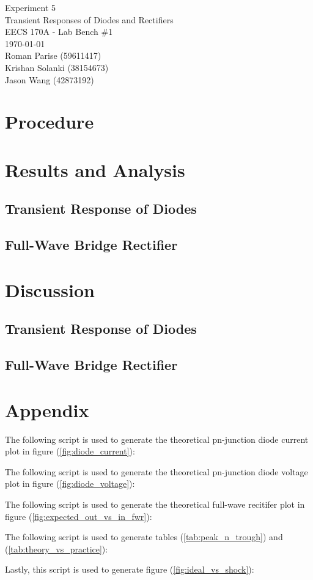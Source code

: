 \documentclass{article}
\begin{document}
	\begin{titlepage}
		\centering
		\Huge{Experiment 5} \\
		\huge{Transient Responses of Diodes and Rectifiers} \\
		\vspace{1cm}
		\large{EECS 170A - Lab Bench \#1} \\
		\large{\today} \\
		\vspace{1cm}
		\normalsize{Roman Parise (59611417)} \\
		\normalsize{Krishan Solanki (38154673)} \\
		\normalsize{Jason Wang (42873192)} \\
	\end{titlepage}
\section{Procedure}

\section{Results and Analysis}
\subsection{Transient Response of Diodes}

\subsection{Full-Wave Bridge Rectifier}

\section{Discussion}
\subsection{Transient Response of Diodes}

\subsection{Full-Wave Bridge Rectifier}

\section{Appendix}
The following script is used to generate the theoretical pn-junction diode current plot in figure (\ref{fig:diode_current}):

The following script is used to generate the theoretical pn-junction diode voltage plot in figure (\ref{fig:diode_voltage}):

The following script is used to generate the theoretical full-wave recitifer plot in figure (\ref{fig:expected_out_vs_in_fwr}):

The following script is used to generate tables (\ref{tab:peak_n_trough}) and (\ref{tab:theory_vs_practice}):

Lastly, this script is used to generate figure (\ref{fig:ideal_vs_shock}):

\end{document}
